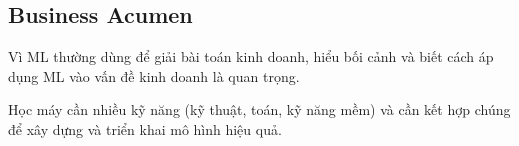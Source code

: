 \subsection{Business Acumen}

\begin{ynghia}[title={Hiểu bối cảnh kinh doanh}]
Vì ML thường dùng để giải bài toán kinh doanh, hiểu bối cảnh và biết cách áp dụng ML vào vấn đề kinh doanh là quan trọng.
\end{ynghia}

\begin{luuy}[title={Kết luận}]
Học máy cần nhiều kỹ năng (kỹ thuật, toán, kỹ năng mềm) và cần kết hợp chúng để xây dựng và triển khai mô hình hiệu quả.
\end{luuy}

\begin{vidu}[title={Hình minh hoạ kỹ năng nền tảng}]
\end{vidu}
